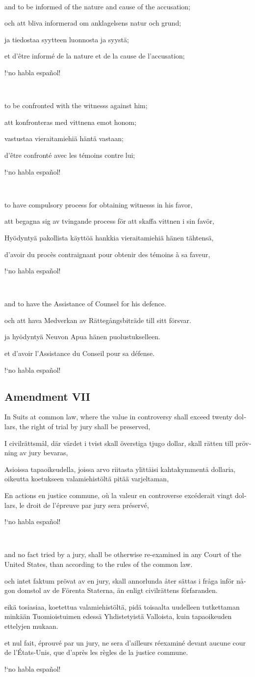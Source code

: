 \documentclass[a4paper,landscape,10pt]{article}
\newcommand{\tblock}[5]{\noindent\begin{minipage}[t]{0.18\textwidth}\foreignlanguage{english}{#1}\end{minipage}\hskip 0.025\textwidth\begin{minipage}[t]{0.18\textwidth}\foreignlanguage{swedish}{#2}\end{minipage}\hskip 0.025\textwidth\begin{minipage}[t]{0.18\textwidth}\foreignlanguage{finnish}{#3}\end{minipage}\hskip 0.025\textwidth\begin{minipage}[t]{0.18\textwidth}\foreignlanguage{french}{#4}\end{minipage}\hskip 0.025\textwidth\begin{minipage}[t]{0.18\textwidth}\foreignlanguage{spanish}{#5}\end{minipage}}
\begin{document}
~

\tblock
{and to be informed of the nature and cause of the accusation;}
{och att bliva informerad om anklagelsens natur och grund;}
{ja tiedostaa syytteen luonnosta ja syystä;}
{et d'être informé de la nature et de la cause de l'accusation;}
{!`no habla español!}

~

\tblock
{to be confronted with the \glspl{witness} against him;}
{att konfronteras med vittnena emot honom;}	
{vastustaa vieraitamiehiä häntä vastaan;}
{d'être confronté avec les témoins contre lui;}
{!`no habla español!}

~

\tblock
{to have compulsory process for obtaining \glspl{witness} in his favor,}
{att begagna sig av tvingande process för att skaffa vittnen i sin favör,}
{Hyödyntyä pakollista käyttöä hankkia vieraitamiehiä hänen tähtensä,}
{d'avoir du procès contraignant pour obtenir des témoins à sa faveur,}
{!`no habla español!}

~

\tblock
{and to have the Assistance of Counsel for his defence.}
{och att hava Medverkan av Rättegångsbiträde till sitt försvar.}
{ja hyödyntyä Neuvon Apua hänen puolustukselleen.}
{et d'avoir l'Assistance du Conseil pour sa défense.}
{!`no habla español!}


\subsection*{Amendment VII}
\tblock
{In Suits at common law, where the value in controversy shall exceed twenty dollars, the right of trial by jury shall be preserved,}
{I civilrättsmål, där värdet i tvist skall överstiga tjugo dollar, skall rätten till prövning av jury bevaras,}
{Asioissa tapaoikeudella, joissa arvo riitasta ylittäisi kahtakymmentä dollaria, oikeutta koetukseen valamiehistöltä pitää varjeltaman,}
{En actions en justice commune, où la valeur en controverse excéderait vingt dollars, le droit de l'épreuve par jury sera préservé,}
{!`no habla español!}

~

\tblock
{and no fact tried by a jury, shall be otherwise re-examined in any Court of the United States, than according to the rules of the common law.}
{och intet faktum prövat av en jury, skall annorlunda åter sättas i fråga inför någon domstol av de Förenta Staterna, än enligt civilrättens förfaranden.}
{eikä tosiasiaa, koetettua valamiehistöltä, pidä toisaalta uudelleen tutkettaman minkään Tuomioistuimen edessä Yhdistetyistä Valloista, kuin tapaoikeuden ettelyjen mukaan.}
{et nul fait, éprouvé par un jury, ne sera d'ailleurs réexaminé devant aucune cour de l'États-Unis, que d'après les règles de la justice commune.}
{!`no habla español!}
\end{document}

